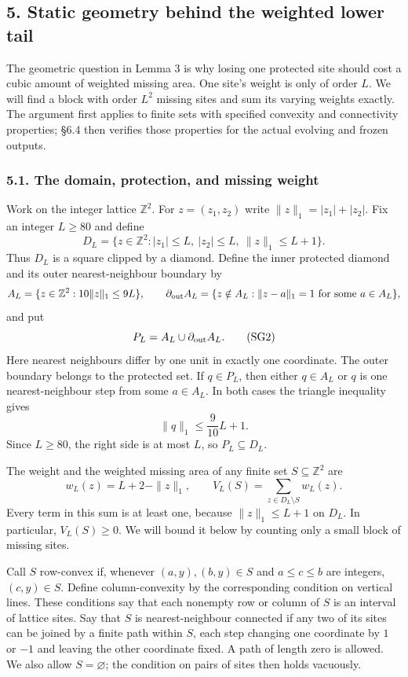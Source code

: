 \documentclass[
  11pt,
  a4paper,
]{article}
\begin{document}
\subsection{5. Static geometry behind the weighted lower
tail}\label{static-geometry-behind-the-weighted-lower-tail}

The geometric question in Lemma 3 is why losing one protected site
should cost a cubic amount of weighted missing area. One site's weight
is only of order \(L\). We will find a block with order \(L^2\) missing
sites and sum its varying weights exactly. The argument first applies to
finite sets with specified convexity and connectivity properties; §6.4
then verifies those properties for the actual evolving and frozen
outputs.

\subsubsection{5.1. The domain, protection, and missing
weight}\label{the-domain-protection-and-missing-weight}

Work on the integer lattice \(\mathbb Z^2\). For \(z=(z_1,z_2)\) write
\(\|z\|_1=|z_1|+|z_2|\). Fix an integer \(L\geq80\) and define \[
D_L=\{z\in\mathbb Z^2:|z_1|\leq L,\ |z_2|\leq L,\ \|z\|_1\leq L+1\}.
\tag{SG1}
\] Thus \(D_L\) is a square clipped by a diamond. Define the inner
protected diamond and its outer nearest-neighbour boundary by \[
A_L=\{z\in\mathbb Z^2:10\|z\|_1\leq9L\},\qquad
\partial_{\rm out}A_L
=\{z\notin A_L:\|z-a\|_1=1\text{ for some }a\in A_L\},
\] and put \[
P_L=A_L\cup\partial_{\rm out}A_L.
\tag{SG2}
\] Here nearest neighbours differ by one unit in exactly one coordinate.
The outer boundary belongs to the protected set. If \(q\in P_L\), then
either \(q\in A_L\) or \(q\) is one nearest-neighbour step from some
\(a\in A_L\). In both cases the triangle inequality gives \[
\|q\|_1\leq\frac9{10}L+1.
\tag{SG3}
\] Since \(L\geq80\), the right side is at most \(L\), so
\(P_L\subseteq D_L\).

The weight and the weighted missing area of any finite set
\(S\subseteq\mathbb Z^2\) are \[
w_L(z)=L+2-\|z\|_1,\qquad
V_L(S)=\sum_{z\in D_L\setminus S}w_L(z).
\tag{SG4}
\] Every term in this sum is at least one, because \(\|z\|_1\leq L+1\)
on \(D_L\). In particular, \(V_L(S)\geq0\). We will bound it below by
counting only a small block of missing sites.

Call \(S\) row-convex if, whenever \((a,y),(b,y)\in S\) and
\(a\leq c\leq b\) are integers, \((c,y)\in S\). Define column-convexity
by the corresponding condition on vertical lines. These conditions say
that each nonempty row or column of \(S\) is an interval of lattice
sites. Say that \(S\) is nearest-neighbour connected if any two of its
sites can be joined by a finite path within \(S\), each step changing
one coordinate by \(1\) or \(-1\) and leaving the other coordinate
fixed. A path of length zero is allowed. We also allow
\(S=\varnothing\); the condition on pairs of sites then holds vacuously.
\end{document}
